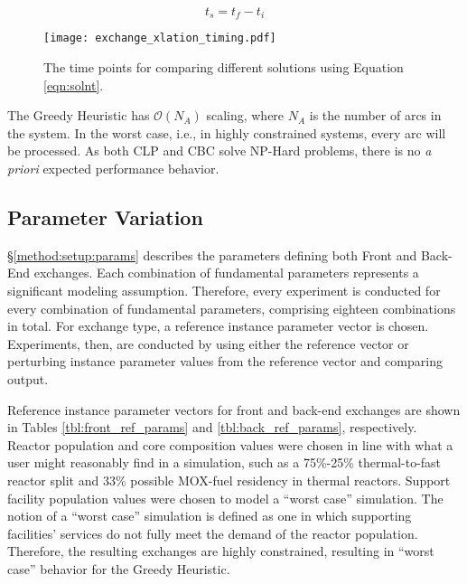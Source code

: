 \begin{equation}\label{eqn:solnt}
t_s = t_f - t_i
\end{equation}

\begin{figure}
  \begin{center}
    \texttt{[image: exchange\_xlation\_timing.pdf]}
    \caption[]{
      \label{fig:dre_time}
      The time points for comparing different solutions using Equation \ref{eqn:solnt}.}
  \end{center}
\end{figure}

The Greedy Heuristic has $\mathcal{O}(N_A)$ scaling, where $N_A$ is the number
of arcs in the system. In the worst case, i.e., in highly constrained systems,
every arc will be processed. As both CLP and CBC solve NP-Hard problems, there
is no \textit{a priori} expected performance behavior.

\subsection{Parameter Variation}

\S \ref{method:setup:params} describes the parameters defining both Front and
Back-End exchanges. Each combination of fundamental parameters represents a
significant modeling assumption. Therefore, every experiment is conducted for
every combination of fundamental parameters, comprising eighteen combinations in
total. For exchange type, a reference instance parameter vector is
chosen. Experiments, then, are conducted by using either the reference vector or
perturbing instance parameter values from the reference vector and comparing
output.

Reference instance parameter vectors for front and back-end exchanges are shown
in Tables \ref{tbl:front_ref_params} and \ref{tbl:back_ref_params},
respectively. Reactor population and core composition values were chosen in line
with what a user might reasonably find in a simulation, such as a 75\%-25\%
thermal-to-fast reactor split and 33\% possible MOX-fuel residency in thermal
reactors. Support facility population values were chosen to model a ``worst
case'' simulation. The notion of a ``worst case'' simulation is defined as one
in which supporting facilities' services do not fully meet the demand of the
reactor population. Therefore, the resulting exchanges are highly constrained,
resulting in ``worst case'' behavior for the Greedy Heuristic. 

